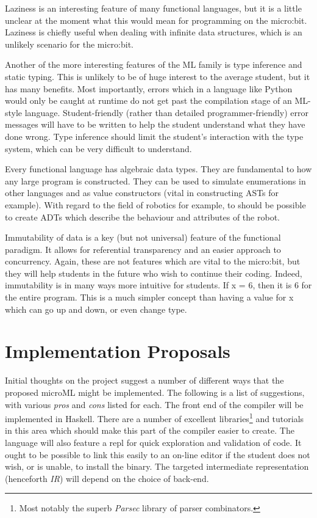 \documentclass[11pt, a4paper]{article}
\begin{document}
Laziness is an interesting feature of many functional languages, but it is a little unclear at the
moment what this would mean for programming on the micro:bit. Laziness is chiefly useful when dealing
with infinite data structures, which is an unlikely scenario for the micro:bit.

Another of the more interesting features of the ML family is type inference and static typing. This
is unlikely to be of huge interest to the average student, but it has many benefits. Most
importantly, errors which in a language like Python would only be caught at runtime do not get past
the compilation stage of an ML-style language. Student-friendly (rather than detailed
programmer-friendly) error messages will have to be
written to help the student understand what they have done wrong. Type inference should limit the
student's interaction with the type system, which can be very difficult to understand.

Every functional language has algebraic data types. They are fundamental to how any large program is
constructed. They can be used to simulate enumerations in other languages and as value constructors
(vital in constructing ASTs for example). With regard to the field of robotics for example, to
should be possible to create ADTs which describe the behaviour and attributes of the robot.

Immutability of data is a key (but not universal) feature of the functional paradigm. It allows for
referential transparency and an easier approach to concurrency. Again, these are not features which
are vital to the micro:bit, but they will help students in the future who wish to continue their
coding. Indeed, immutability is in many ways more intuitive for students. If x = 6, then it is 6 for
the entire program. This is a much simpler concept than having a value for x which can go up and down,
or even change type.

\section{Implementation Proposals}
Initial thoughts on the project suggest a number of different ways that the proposed microML might
be implemented. The following is a list of suggestions, with various \textit{pros} and \textit{cons}
listed for each.
The front end of the compiler will be implemented in Haskell. There are a number of excellent
libraries\footnote{Most notably the superb \textit{Parsec} library of parser combinators.} 
and tutorials in this area which should make this part of the compiler easier to
create. The language will also feature a repl for quick exploration and validation of code. It ought to be possible
to link this easily to an on-line editor if the student does not wish, or is unable, to install the
binary. The targeted intermediate representation (henceforth \textit{IR}) will depend on the choice
of back-end.
\end{document}
